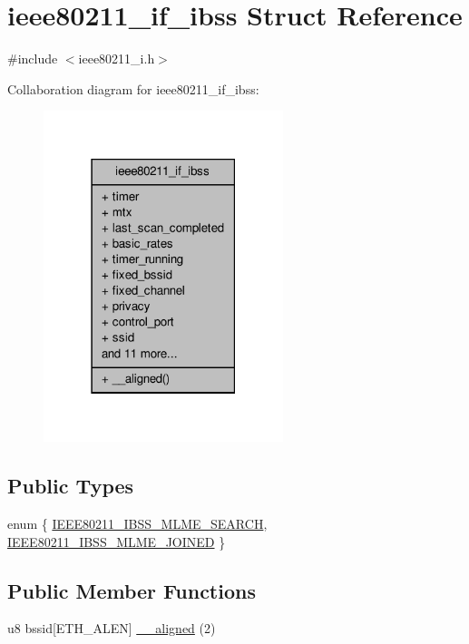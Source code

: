 \hypertarget{structieee80211__if__ibss}{\section{ieee80211\-\_\-if\-\_\-ibss Struct Reference}
\label{structieee80211__if__ibss}
}


{\ttfamily \#include $<$ieee80211\-\_\-i.\-h$>$}



Collaboration diagram for ieee80211\-\_\-if\-\_\-ibss\-:
\nopagebreak
\begin{figure}[H]
\begin{center}
\leavevmode
\includegraphics[width=198pt]{structieee80211__if__ibss__coll__graph}
\end{center}
\end{figure}
\subsection*{Public Types}
\begin{DoxyCompactItemize}
\item 
enum \{ \hyperlink{structieee80211__if__ibss_a0411cd49bb5b71852cecd93bcbf0ca2da74a07e1c77254e60cbe5ba98cdd1f5ac}{I\-E\-E\-E80211\-\_\-\-I\-B\-S\-S\-\_\-\-M\-L\-M\-E\-\_\-\-S\-E\-A\-R\-C\-H}, 
\hyperlink{structieee80211__if__ibss_a0411cd49bb5b71852cecd93bcbf0ca2dad8ebf6128c567875ba4bf30a7407d6ce}{I\-E\-E\-E80211\-\_\-\-I\-B\-S\-S\-\_\-\-M\-L\-M\-E\-\_\-\-J\-O\-I\-N\-E\-D}
 \}
\end{DoxyCompactItemize}
\subsection*{Public Member Functions}
\begin{DoxyCompactItemize}
\item 
u8 bssid\mbox{[}E\-T\-H\-\_\-\-A\-L\-E\-N\mbox{]} \hyperlink{structieee80211__if__ibss_af446847dcbfde15aabb52beb5b1972e5}{\-\_\-\-\_\-aligned} (2)
\end{DoxyCompactItemize}
